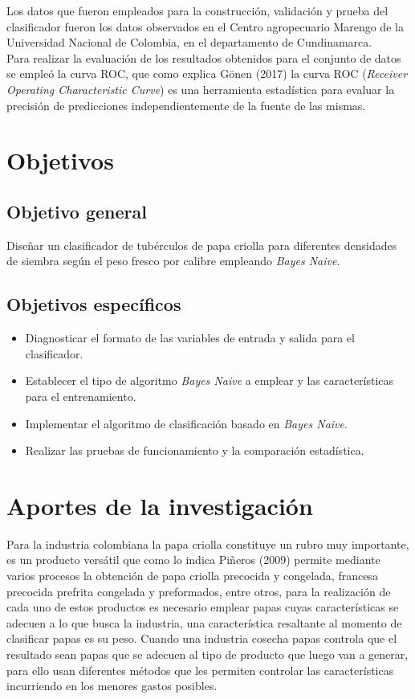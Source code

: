Los datos que fueron empleados para la construcción, validación y prueba del clasificador
fueron los datos observados en el Centro agropecuario Marengo de la Universidad Nacional de
Colombia, en el departamento de Cundinamarca.\\

Para realizar la evaluación de los resultados obtenidos para el conjunto de datos
se empleó la curva ROC, que como explica Gönen (2017) la curva ROC (\textit{Receiver
Operating Characteristic Curve}) es una herramienta estadística para evaluar la precisión
de predicciones independientemente de la fuente de las mismas.

\section{Objetivos}

\subsection{Objetivo general}

Diseñar un clasificador de tubérculos de papa criolla para diferentes densidades de
siembra según el peso fresco por calibre empleando \textit{Bayes Naive}.

\subsection{Objetivos espec\'ificos}

\begin{itemize}
\item  Diagnosticar el formato de las variables de entrada y salida para el clasificador.
\item	 Establecer el tipo de algoritmo \textit{Bayes Naive} a emplear y las
características para el entrenamiento.
\item  Implementar el algoritmo de clasificación basado en \textit{Bayes Naive}.
\item  Realizar las pruebas de funcionamiento y la comparación estadística.
\end{itemize}

\section{Aportes de la investigación}

Para la industria colombiana la papa criolla constituye un rubro muy importante, es un
producto versátil que como lo indica Piñeros (2009) permite mediante varios procesos la
obtención de papa criolla precocida y congelada, francesa precocida prefrita congelada
y preformados, entre otros, para la realización de cada uno de estos productos es
necesario emplear papas cuyas características se adecuen a lo que busca la industria,
una característica resaltante al momento de clasificar papas es su peso. Cuando una
industria cosecha papas controla que el resultado sean papas que se adecuen al tipo de
producto que luego van a generar, para ello usan diferentes métodos que les permiten
controlar las características incurriendo en los menores gastos posibles.\\

